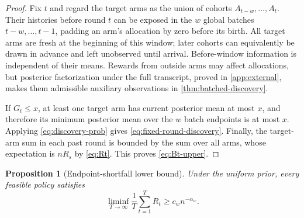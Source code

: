 \documentclass[11pt,letterpaper]{article}
\numberwithin{equation}{section}
\newtheorem{proposition}[proposition]{Proposition}
\theoremstyle{definition}
\theoremstyle{remark}
\newcommand{\1}{\mathbf{1}}
\begin{document}
\begin{proof}
Fix $t$ and regard the target arms as the union of cohorts
$A_{t-w},\ldots,A_t$.  Their histories before round $t$ can be exposed in the
$w$ global batches $t-w,\ldots,t-1$, padding an arm's allocation by zero before
its birth.  All target arms are fresh at the beginning of this window; later cohorts
can equivalently be drawn in advance and left unobserved until arrival.
Before-window information is independent of their means. Rewards from
outside arms may affect allocations, but posterior factorization under
the full transcript, proved in \cref{app:external}, makes them admissible
auxiliary observations in \cref{thm:batched-discovery}.

If $G_t\le x$, at least one target arm has current posterior mean at most $x$,
and therefore its minimum posterior mean over the $w$ batch endpoints is at
most $x$.  Applying \cref{eq:discovery-prob} gives
\cref{eq:fixed-round-discovery}.  Finally, the target-arm sum in each past round
is bounded by the sum over all arms, whose expectation is $nR_s$ by
\cref{eq:Rt}.  This proves \cref{eq:Bt-upper}.
\end{proof}

\begin{proposition}[Endpoint-shortfall lower bound]\label{prop:endpoint-lower}
Under the uniform prior, every feasible policy satisfies
\begin{equation}\label{eq:endpoint-lower}
  \liminf_{T\to\infty}\frac1T\sum_{t=1}^{T}R_t
  \ge c_w n^{-\alpha_w}.
\end{equation}
\end{proposition}
\end{document}

